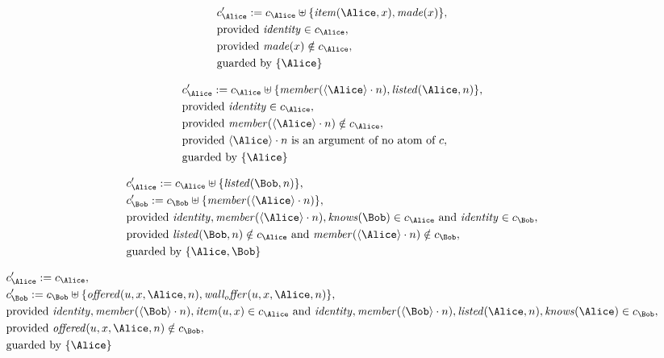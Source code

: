 \begin{align*}
&
c'_
{
\Alice
}
 := 
c_
{
\Alice
}
 \uplus 
\{
\mathit{
item
}
(
\Alice
,
x
)
,
\mathit{
made
}
(
x
)
\}
,\\
&
\text{provided } 
\mathit{
identity
}
 \in c_
{
\Alice
}
,\\
&
\text{provided } 
\mathit{
made
}
(
x
)
 \notin c_
{
\Alice
}
,\\
&
\text{guarded by } \{
\Alice
\}
\end{align*}

\begin{align*}
&
c'_
{
\Alice
}
 := 
c_
{
\Alice
}
 \uplus 
\{
\mathit{
member
}
(
\langle
\Alice
\rangle
\cdot
n
)
,
\mathit{
listed
}
(
\Alice
,
n
)
\}
,\\
&
\text{provided } 
\mathit{
identity
}
 \in c_
{
\Alice
}
,\\
&
\text{provided } 
\mathit{
member
}
(
\langle
\Alice
\rangle
\cdot
n
)
 \notin c_
{
\Alice
}
,\\
&
\text{provided } 
\langle
\Alice
\rangle
\cdot
n
 \text{ is an argument of no atom of } c
,\\
&
\text{guarded by } \{
\Alice
\}
\end{align*}

\begin{align*}
&
c'_
{
\Alice
}
 := 
c_
{
\Alice
}
 \uplus 
\{
\mathit{
listed
}
(
\Bob
,
n
)
\}
,\\
&
c'_
{
\Bob
}
 := 
c_
{
\Bob
}
 \uplus 
\{
\mathit{
member
}
(
\langle
\Alice
\rangle
\cdot
n
)
\}
,\\
&
\text{provided } 
\mathit{
identity
}
,
\mathit{
member
}
(
\langle
\Alice
\rangle
\cdot
n
)
,
\mathit{
knows
}
(
\Bob
)
 \in c_
{
\Alice
}
 \text{ and } 
\mathit{
identity
}
 \in c_
{
\Bob
}
,\\
&
\text{provided } 
\mathit{
listed
}
(
\Bob
,
n
)
 \notin c_
{
\Alice
}
 \text{ and } 
\mathit{
member
}
(
\langle
\Alice
\rangle
\cdot
n
)
 \notin c_
{
\Bob
}
,\\
&
\text{guarded by } \{
\Alice
,
\Bob
\}
\end{align*}

\begin{align*}
&
c'_
{
\Alice
}
 := 
c_
{
\Alice
}
,\\
&
c'_
{
\Bob
}
 := 
c_
{
\Bob
}
 \uplus 
\{
\mathit{
offered
}
(
u
,
x
,
\Alice
,
n
)
,
\mathit{
wall_offer
}
(
u
,
x
,
\Alice
,
n
)
\}
,\\
&
\text{provided } 
\mathit{
identity
}
,
\mathit{
member
}
(
\langle
\Bob
\rangle
\cdot
n
)
,
\mathit{
item
}
(
u
,
x
)
 \in c_
{
\Alice
}
 \text{ and } 
\mathit{
identity
}
,
\mathit{
member
}
(
\langle
\Bob
\rangle
\cdot
n
)
,
\mathit{
listed
}
(
\Alice
,
n
)
,
\mathit{
knows
}
(
\Alice
)
 \in c_
{
\Bob
}
,\\
&
\text{provided } 
\mathit{
offered
}
(
u
,
x
,
\Alice
,
n
)
 \notin c_
{
\Bob
}
,\\
&
\text{guarded by } \{
\Alice
\}
\end{align*}
